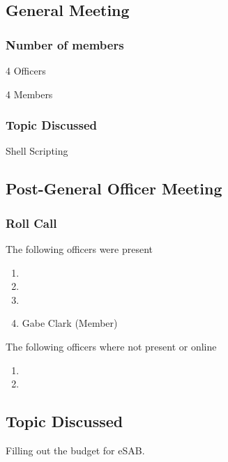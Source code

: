 \subsection{General Meeting}

\subsubsection{Number of members}
4 Officers

4 Members


\subsubsection{Topic Discussed}

Shell Scripting

\subsection{Post-General Officer Meeting}

\subsubsection{Roll Call}
The following officers were present

\begin{enumerate}
\item \tresurer
\item \primaryprogrammer
\item \president
\item Gabe Clark (Member)
\end{enumerate}

The following officers where not present or online

\begin{enumerate}
    \item \secretary
    \item \vicepresident
\end{enumerate}

\subsection{Topic Discussed}

Filling out the budget for eSAB.

